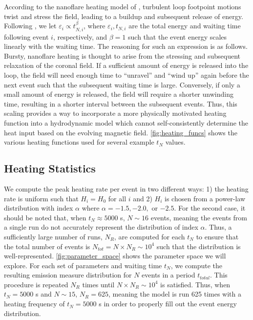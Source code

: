 \documentclass[apj]{emulateapj}
\begin{document}
	\par According to the nanoflare heating model of \citet{parker_nanoflares_1988}, turbulent loop footpoint motions twist and stress the field, leading to a buildup and subsequent release of energy. Following \citet{cargill_active_2014}, we let $\varepsilon_i\propto t_{N,i}^{\beta}$, where $\varepsilon_i,t_{N,i}$ are the total energy and waiting time following event $i$, respectively, and $\beta=1$ such that the event energy scales linearly with the waiting time. The reasoning for such an expression is as follows. Bursty, nanoflare heating is thought to arise from the stressing and subsequent relaxation of the coronal field. If a sufficient amount of energy is released into the loop, the field will need enough time to ``unravel'' and ``wind up'' again before the next event such that the subsequent waiting time is large. Conversely, if only a small amount of energy is released, the field will require a shorter unwinding time, resulting in a shorter interval between the subsequent events. Thus, this scaling provides a way to incorporate a more physically motivated heating function into a hydrodynamic model which cannot self-consistently determine the heat input based on the evolving magnetic field. \autoref{fig:heating_funcs} shows the various heating functions used for several example $t_N$ values.
	\subsection{Heating Statistics}
	\label{subsec:heating_stats}
	\par We compute the peak heating rate per event in two different ways: 1) the heating rate is uniform such that $H_i=H_0$ for all $i$ and 2) $H_i$ is chosen from a power-law distribution with index $\alpha$ where $\alpha=-1.5,-2.0,$ or $-2.5$. For the second case, it should be noted that, when $t_N\approx5000$ s, $N\sim16$ events, meaning the events from a single run do not accurately represent the distribution of index $\alpha$. Thus, a sufficiently large number of runs, $N_{R}$, are computed for each $t_N$ to ensure that the total number of events is $N_{tot}=N\times N_{R}\sim10^4$ such that the distribution is well-represented. \autoref{fig:parameter_space} shows the parameter space we will explore. For each set of parameters and waiting time $t_N$, we compute the resulting emission measure distribution for $N$ events in a period $t_{total}$. This procedure is repeated $N_R$ times until $N\times N_R\sim10^4$ is satisfied. Thus, when $t_N=5000$ s and $N\sim15$, $N_R=625$, meaning the model is run 625 times with a heating frequency of $t_N=5000$ s in order to properly fill out the event energy distribution.
\end{document}
